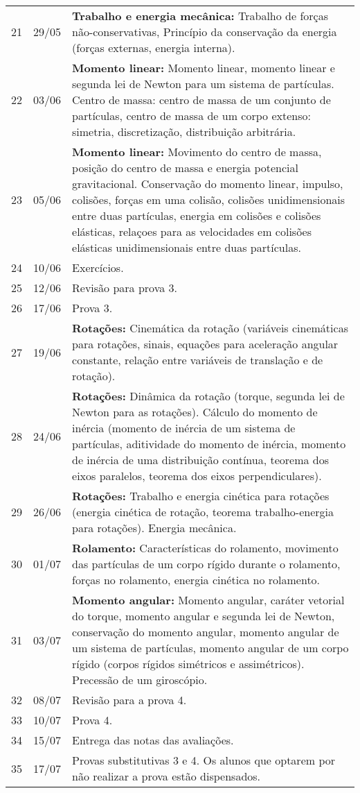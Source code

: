 \begin{center}
\begin{longtable}{ccp{70mm}}
 21 & 29/05 & \textbf{Trabalho e energia mecânica:} Trabalho de forças não-conservativas, Princípio da conservação da energia (forças externas, energia interna). \\
 22 & 03/06 & \textbf{Momento linear:} Momento linear, momento linear e segunda lei de Newton para um sistema de partículas. Centro de massa: centro de massa de um conjunto de partículas, centro de massa de um corpo extenso: simetria, discretização, distribuição arbitrária. \\ 
 23 & 05/06 & \textbf{Momento linear:} Movimento do centro de massa, posição do centro de massa e energia potencial gravitacional. Conservação do momento linear, impulso, colisões, forças em uma colisão, colisões unidimensionais entre duas partículas, energia em colisões e colisões elásticas, relaçoes para as velocidades em colisões elásticas unidimensionais entre duas partículas. \\
 24 & 10/06 & Exercícios. \\
 25 & 12/06 & Revisão para prova 3. \\
 26 & 17/06 & Prova 3. \\
 27 & 19/06 & \textbf{Rotações:} Cinemática da rotação (variáveis cinemáticas para rotações, sinais, equações para aceleração angular constante, relação entre variáveis de translação e de rotação). \\
 28 & 24/06 & \textbf{Rotações:} Dinâmica da rotação (torque, segunda lei de Newton para as rotações). Cálculo do momento de inércia (momento de inércia de um sistema de partículas, aditividade do momento de inércia, momento de inércia de uma distribuição contínua, teorema dos eixos paralelos, teorema dos eixos perpendiculares). \\
 29 & 26/06 & \textbf{Rotações:} Trabalho e energia cinética para rotações (energia cinética de rotação, teorema trabalho-energia para rotações). Energia mecânica.\\
 30 & 01/07 & \textbf{Rolamento:} Características do rolamento, movimento das partículas de um corpo rígido durante o rolamento, forças no rolamento, energia cinética no rolamento.\\
 31 & 03/07 & \textbf{Momento angular:} Momento angular, caráter vetorial do torque, momento angular e segunda lei de Newton, conservação do momento angular, momento angular de um sistema de partículas, momento angular de um corpo rígido (corpos rígidos simétricos e assimétricos). Precessão de um giroscópio.\\
 32 & 08/07 & Revisão para a prova 4. \\
 33 & 10/07 & Prova 4. \\
 34 & 15/07 & Entrega das notas das avaliações. \\
 35 & 17/07 & Provas substitutivas 3 e 4. Os alunos que optarem por não realizar a prova estão dispensados.
\end{longtable}
\end{center}
\cleardoublepage
